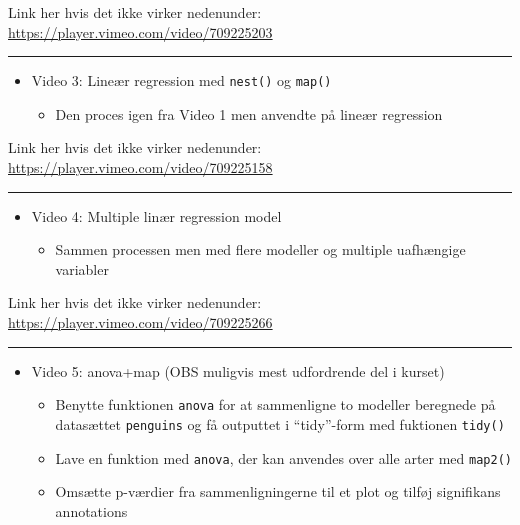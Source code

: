 \documentclass[
]{book}
\providecommand{\tightlist}{%
  \setlength{\itemsep}{0pt}\setlength{\parskip}{0pt}}
\begin{document}
Link her hvis det ikke virker nedenunder: \url{https://player.vimeo.com/video/709225203}

\begin{center}\rule{0.5\linewidth}{0.5pt}\end{center}

\begin{itemize}
\tightlist
\item
  Video 3: Lineær regression med \texttt{nest()} og \texttt{map()}

  \begin{itemize}
  \tightlist
  \item
    Den proces igen fra Video 1 men anvendte på lineær regression
  \end{itemize}
\end{itemize}

Link her hvis det ikke virker nedenunder: \url{https://player.vimeo.com/video/709225158}

\begin{center}\rule{0.5\linewidth}{0.5pt}\end{center}

\begin{itemize}
\tightlist
\item
  Video 4: Multiple linær regression model

  \begin{itemize}
  \tightlist
  \item
    Sammen processen men med flere modeller og multiple uafhængige variabler
  \end{itemize}
\end{itemize}

Link her hvis det ikke virker nedenunder: \url{https://player.vimeo.com/video/709225266}

\begin{center}\rule{0.5\linewidth}{0.5pt}\end{center}

\begin{itemize}
\tightlist
\item
  Video 5: anova+map (OBS muligvis mest udfordrende del i kurset)

  \begin{itemize}
  \tightlist
  \item
    Benytte funktionen \texttt{anova} for at sammenligne to modeller beregnede på datasættet \texttt{penguins} og få outputtet i ``tidy''-form med fuktionen \texttt{tidy()}
  \item
    Lave en funktion med \texttt{anova}, der kan anvendes over alle arter med \texttt{map2()}
  \item
    Omsætte p-værdier fra sammenligningerne til et plot og tilføj signifikans annotations
  \end{itemize}
\end{itemize}
\end{document}
